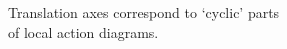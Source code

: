 \documentclass[preview]{standalone}
\begin{document}
Translation axes correspond to `cyclic' parts \\ of local action diagrams.\\
\end{document}
